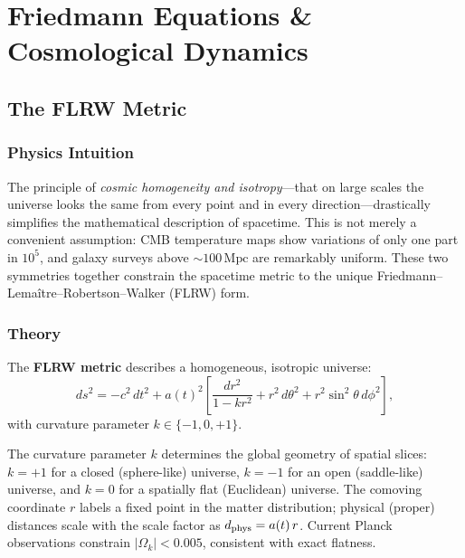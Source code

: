 
\chapter{Friedmann Equations \& Cosmological Dynamics}

\section{The FLRW Metric}

\subsection{Physics Intuition}

\begin{intuition}
The principle of \emph{cosmic homogeneity and isotropy}—that on large scales the
universe looks the same from every point and in every direction—drastically
simplifies the mathematical description of spacetime.
This is not merely a convenient assumption: CMB temperature maps show variations
of only one part in $10^5$, and galaxy surveys above $\sim100\,\mathrm{Mpc}$ are
remarkably uniform. These two symmetries together constrain the spacetime metric
to the unique Friedmann--Lema\^itre--Robertson--Walker (FLRW) form.
\end{intuition}

\subsection{Theory}

\begin{theory}
The \textbf{FLRW metric} describes a homogeneous, isotropic universe:
\begin{equation}
  ds^2 = -c^2\,dt^2 + a(t)^2
    \!\left[\frac{dr^2}{1-kr^2} + r^2\,d\theta^2 + r^2\!\sin^2\!\theta\,d\phi^2\right],
\end{equation}
with curvature parameter $k\in\{-1,0,+1\}$.

The curvature parameter $k$ determines the global geometry of spatial slices:
$k=+1$ for a closed (sphere-like) universe, $k=-1$ for an open (saddle-like)
universe, and $k=0$ for a spatially flat (Euclidean) universe.
The comoving coordinate $r$ labels a fixed point in the matter distribution;
physical (proper) distances scale with the scale factor as $d_{\rm phys} = a(t)\,r$.
Current Planck observations constrain $|\Omega_k| < 0.005$, consistent with exact flatness.
\end{theory}

